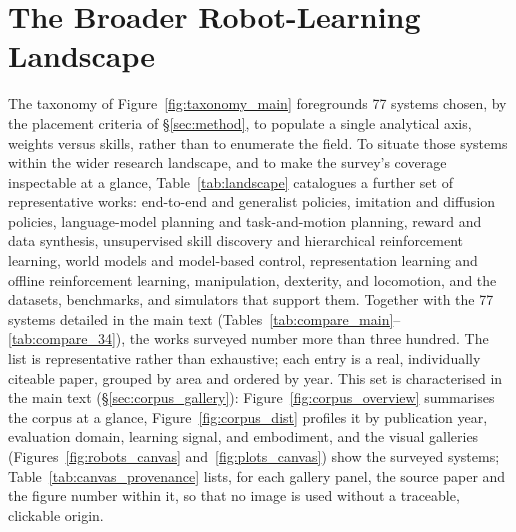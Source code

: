 \documentclass[acmsmall,review,anonymous]{acmart}
\begin{document}
%
\clearpage
%
%
\appendix
\section{The Broader Robot-Learning Landscape}
\label{sec:landscape}

The taxonomy of Figure~\ref{fig:taxonomy_main} foregrounds 77 systems chosen, by the placement
criteria of \S\ref{sec:method}, to populate a single analytical axis, weights versus skills, rather
than to enumerate the field. To situate those systems
within the wider research landscape, and to make the survey's coverage inspectable at a glance,
Table~\ref{tab:landscape} catalogues a further set of representative works: end-to-end and generalist
policies, imitation and diffusion policies, language-model planning and task-and-motion planning,
reward and data synthesis, unsupervised skill discovery and hierarchical reinforcement learning, world
models and model-based control, representation learning and offline reinforcement learning,
manipulation, dexterity, and locomotion, and the datasets, benchmarks, and simulators that support
them. Together with the 77 systems detailed in the main text
(Tables~\ref{tab:compare_main}--\ref{tab:compare_34}), the works surveyed number more than three
hundred. The list is representative rather than exhaustive; each entry is a real, individually
citeable paper, grouped by area and ordered by year. This set is characterised in the main text
(\S\ref{sec:corpus_gallery}): Figure~\ref{fig:corpus_overview} summarises the corpus at a glance,
Figure~\ref{fig:corpus_dist} profiles it by publication year, evaluation domain, learning signal,
and embodiment, and the visual galleries (Figures~\ref{fig:robots_canvas} and~\ref{fig:plots_canvas})
show the surveyed systems; Table~\ref{tab:canvas_provenance} lists, for each gallery panel, the
source paper and the figure number within it, so that no image is used without a traceable,
clickable origin.
\end{document}
